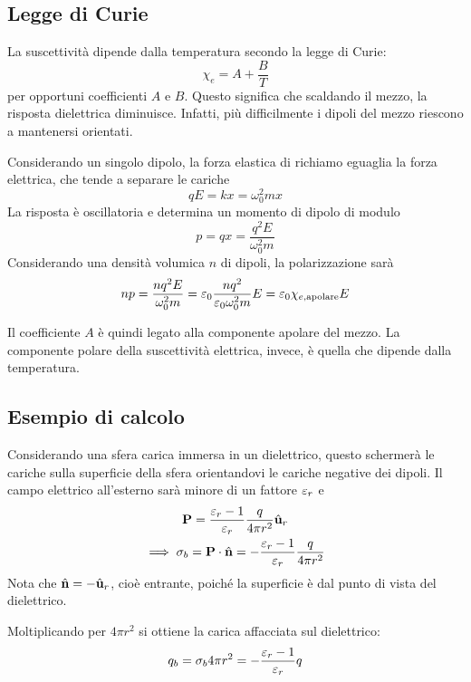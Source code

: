 \subsection{Legge di Curie}

La suscettività dipende dalla temperatura secondo la legge di Curie:
\begin{equation}
    \chi_e = A + \frac{B}{T}
\end{equation}
per opportuni coefficienti $A$ e $B$.
Questo significa che scaldando il mezzo, la risposta dielettrica diminuisce.
Infatti, più difficilmente i dipoli del mezzo riescono a mantenersi orientati.

Considerando un singolo dipolo, la forza elastica di richiamo eguaglia la forza elettrica, che tende a separare le cariche
\begin{equation}
    q E = k x = \omega_0^2 m x
\end{equation}
La risposta è oscillatoria e determina un momento di dipolo di modulo
\begin{equation}
    p = q x = \frac{q^2 E}{\omega_0^2 m}
\end{equation}
Considerando una densità volumica $n$ di dipoli, la polarizzazione sarà
\begin{equation}
    n p = \frac{n q^2 E}{\omega_0^2 m} = \varepsilon_0 \frac{n q^2}{\varepsilon_0 \omega_0^2 m} E = \varepsilon_0 \chi_{e,\text{apolare}} E
\end{equation}

Il coefficiente $A$ è quindi legato alla componente apolare del mezzo.
La componente polare della suscettività elettrica, invece, è quella che dipende dalla temperatura.

\subsection{Esempio di calcolo}

Considerando una sfera carica immersa in un dielettrico, questo schermerà le cariche sulla superficie della sfera orientandovi le cariche negative dei dipoli.
Il campo elettrico all'esterno sarà minore di un fattore $\varepsilon_r$ e
\begin{gather}
    \mathbf{P} = \frac{\varepsilon_r - 1}{\varepsilon_r} \frac{q}{4\pi r^2} \hat{\mathbf{u}}_{r} \\
    \implies \sigma_b = \mathbf{P} \cdot \hat{\mathbf{n}}
    = -\frac{\varepsilon_r - 1}{\varepsilon_r} \frac{q}{4\pi r^2}
\end{gather}
Nota che $\hat{\mathbf{n}} = - \hat{\mathbf{u}}_{r}$, cioè entrante, poiché la superficie è dal punto di vista del dielettrico.

Moltiplicando per $4\pi r^2$ si ottiene la carica affacciata sul dielettrico:
\begin{equation}
    q_b = \sigma_b 4\pi r^2 = - \frac{\varepsilon_r - 1}{\varepsilon_r} q
\end{equation}
